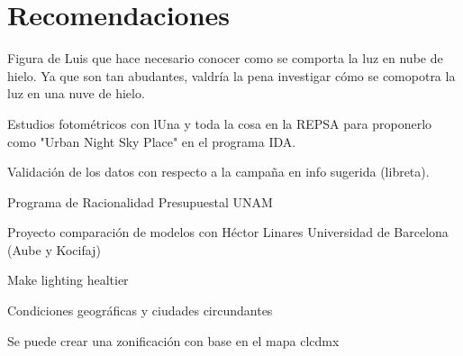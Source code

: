 \chapter{Recomendaciones}
\label{chap:recomendaciones}
 

Figura de Luis que hace necesario conocer como se comporta la luz en nube de hielo. Ya que son tan abudantes, valdría la pena investigar cómo se comopotra la luz en una nuve de hielo. 

Estudios fotométricos con lUna y toda la cosa en la REPSA para proponerlo como "Urban Night Sky Place" en el programa IDA.

Validación de los datos con respecto a la campaña en info sugerida (libreta).

Programa de Racionalidad Presupuestal UNAM

Proyecto comparación de modelos con Héctor Linares Universidad de Barcelona (Aube y Kocifaj)

Make lighting healtier

Condiciones geográficas y ciudades circundantes

Se puede crear una zonificación con base en el mapa clcdmx